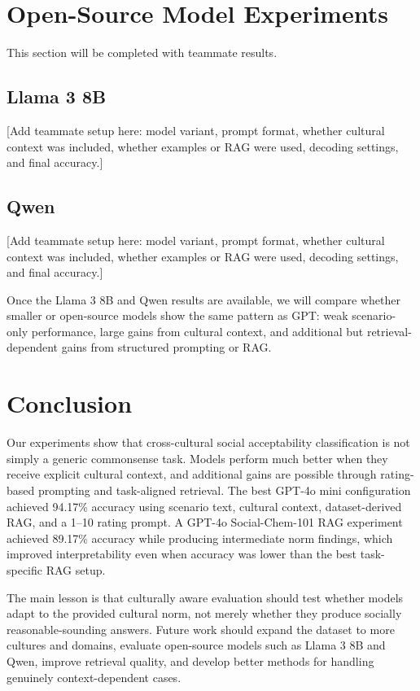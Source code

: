 \section{Open-Source Model Experiments}

This section will be completed with teammate results.

\subsection{Llama 3 8B}

[Add teammate setup here: model variant, prompt format, whether cultural context was included, whether examples or RAG were used, decoding settings, and final accuracy.]

\subsection{Qwen}

[Add teammate setup here: model variant, prompt format, whether cultural context was included, whether examples or RAG were used, decoding settings, and final accuracy.]

Once the Llama 3 8B and Qwen results are available, we will compare whether smaller or open-source models show the same pattern as GPT: weak scenario-only performance, large gains from cultural context, and additional but retrieval-dependent gains from structured prompting or RAG.

\section{Conclusion}

Our experiments show that cross-cultural social acceptability classification is not simply a generic commonsense task. Models perform much better when they receive explicit cultural context, and additional gains are possible through rating-based prompting and task-aligned retrieval. The best GPT-4o mini configuration achieved 94.17\% accuracy using scenario text, cultural context, dataset-derived RAG, and a 1--10 rating prompt. A GPT-4o Social-Chem-101 RAG experiment achieved 89.17\% accuracy while producing intermediate norm findings, which improved interpretability even when accuracy was lower than the best task-specific RAG setup.

The main lesson is that culturally aware evaluation should test whether models adapt to the provided cultural norm, not merely whether they produce socially reasonable-sounding answers. Future work should expand the dataset to more cultures and domains, evaluate open-source models such as Llama 3 8B and Qwen, improve retrieval quality, and develop better methods for handling genuinely context-dependent cases.

